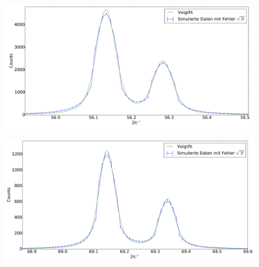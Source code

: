 \begin{figure}[H]
\begin{minipage}{.5\textwidth}
  \centering
  \includegraphics[scale=0.15]{Simulation_Siliciumpulver_3}
  \label{fig:pul_sim_sil_3}
\end{minipage}
\hspace{0.5cm}
\begin{minipage}{.5\textwidth}
  \centering
  \includegraphics[scale=0.15]{Simulation_Siliciumpulver_4}
  \label{fig:pul_sim_sil_4}
\end{minipage}
\end{figure}
